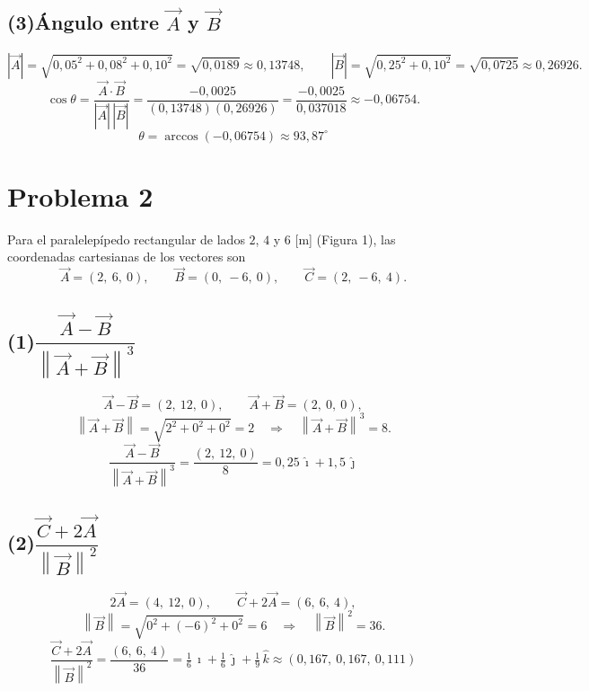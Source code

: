 \documentclass[12pt,letterpaper]{article}
\newcommand{\ii}{\hat{\imath}}
\newcommand{\jj}{\hat{\jmath}}
\newcommand{\kk}{\hat{k}}
\begin{document}
\subsection*{(3)\quad \'Angulo entre $\vec{A}$ y $\vec{B}$}
\[
    |\vec{A}| = \sqrt{0{,}05^2+0{,}08^2+0{,}10^2} = \sqrt{0{,}0189} \approx 0{,}13748,\qquad
    |\vec{B}| = \sqrt{0{,}25^2+0{,}10^2} = \sqrt{0{,}0725} \approx 0{,}26926.
\]
\[
    \cos\theta = \frac{\vec{A}\cdot\vec{B}}{|\vec{A}|\,|\vec{B}|}
    = \frac{-0{,}0025}{(0{,}13748)(0{,}26926)} = \frac{-0{,}0025}{0{,}037018} \approx -0{,}06754.
\]
\[
    \boxed{\theta = \arccos(-0{,}06754) \approx 93{,}87^\circ}
\]

\newpage

\section*{Problema 2}

\noindent Para el paralelep\'ipedo rectangular de lados $2$, $4$ y $6$ [m] (Figura 1), las coordenadas
cartesianas de los vectores son
\[
    \boxed{\vec{A} = (2,\ 6,\ 0),\qquad \vec{B} = (0,\ -6,\ 0),\qquad \vec{C} = (2,\ -6,\ 4).}
\]

\subsection*{(1)\quad $\dfrac{\vec{A} - \vec{B}}{\left\lVert \vec{A} + \vec{B}\right\rVert^{3}}$}
\[
    \vec{A} - \vec{B} = (2,\ 12,\ 0),\qquad \vec{A} + \vec{B} = (2,\ 0,\ 0),
\]
\[
    \left\lVert \vec{A} + \vec{B}\right\rVert = \sqrt{2^2+0^2+0^2} = 2
    \quad\Rightarrow\quad \left\lVert \vec{A} + \vec{B}\right\rVert^{3} = 8.
\]
\[
    \boxed{\dfrac{\vec{A} - \vec{B}}{\left\lVert \vec{A} + \vec{B}\right\rVert^{3}}
    = \frac{(2,\ 12,\ 0)}{8} = 0{,}25\,\ii + 1{,}5\,\jj}
\]

\subsection*{(2)\quad $\dfrac{\vec{C} + 2\vec{A}}{\left\lVert \vec{B}\right\rVert^{2}}$}
\[
    2\vec{A} = (4,\ 12,\ 0),\qquad \vec{C} + 2\vec{A} = (6,\ 6,\ 4),
\]
\[
    \left\lVert \vec{B}\right\rVert = \sqrt{0^2+(-6)^2+0^2} = 6
    \quad\Rightarrow\quad \left\lVert \vec{B}\right\rVert^{2} = 36.
\]
\[
    \boxed{\dfrac{\vec{C} + 2\vec{A}}{\left\lVert \vec{B}\right\rVert^{2}}
    = \frac{(6,\ 6,\ 4)}{36} = \tfrac{1}{6}\,\ii + \tfrac{1}{6}\,\jj + \tfrac{1}{9}\,\kk
    \approx (0{,}167,\ 0{,}167,\ 0{,}111)}
\]
\end{document}
